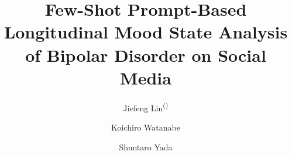 \documentclass[runningheads]{llncs}
\newif\ifshowdiff
\begin{document}
\title{Few-Shot Prompt-Based Longitudinal Mood State Analysis of Bipolar Disorder on Social Media}

\author{Jiefeng Lin\textsuperscript{(\Envelope)} \and
Koichiro Watanabe \and
Shuntaro Yada}


\maketitle

\ifshowdiff
\begin{center}
\fbox{\parbox{0.92\textwidth}{\color{red}\footnotesize
\textbf{改稿トラッキング版（提出版ではありません）。}赤字は査読時の投稿版（6月14日）から追加・変更した箇所、\sout{赤の取り消し線}は削除した箇所を示します。本文は投稿版の文言を基準とし、変更は査読コメントへの対応・数値の修正・出版要件によるものに限っています。マークしていないもの：著者・所属・倫理承認番号の復元（査読用の匿名化の解除）、テンプレート移行に伴う純粋に組版上の差異。なお、Gemini の引用は 2024 年の Gemini ファミリー報告から Gemini~3.1~Pro の Model Card（2026 年）に差し替えました。参考文献リストは BibTeX の自動生成のためマーク不可ですが、ModernBERT 論文（Warner et al.）に DOI とページ番号を補記し、3 件の書誌誤り（MentaLLaMA の著者・頁・表記、Mental-LLM の著者 2 名欠落、BD-Risk の頁番号）を訂正しました。}}
\end{center}
\fi
\end{document}
